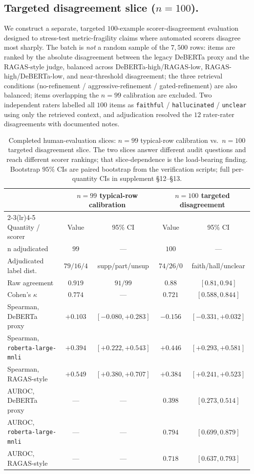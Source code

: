 \subsection{Targeted disagreement slice ($n=100$).}
\label{sec:human_cal_disagreement}

We construct a separate, targeted $100$-example scorer-disagreement
evaluation designed to stress-test metric-fragility claims where
automated scorers disagree most sharply. The batch is \emph{not} a
random sample of the $7{,}500$ rows: items are ranked by the absolute
disagreement between the legacy DeBERTa proxy and the RAGAS-style
judge, balanced across DeBERTa-high/RAGAS-low, RAGAS-high/DeBERTa-low,
and near-threshold disagreement; the three retrieval conditions
(no-refinement / aggressive-refinement / gated-refinement) are also
balanced; items overlapping the $n=99$ calibration are excluded.
Two independent raters labelled all $100$ items as
\texttt{faithful} / \texttt{hallucinated} / \texttt{unclear} using
only the retrieved context, and adjudication resolved the $12$
rater-rater disagreements with documented notes.

\begin{table}[!htb]
\centering
\caption{Completed human-evaluation slices: $n=99$ typical-row
calibration vs.\ $n=100$ targeted disagreement slice. The
two slices answer different audit questions and reach different
scorer rankings; that slice-dependence is the load-bearing finding.
Bootstrap $95\%$ CIs are paired bootstrap from the verification
scripts; full per-quantity CIs in supplement \S 12--\S 13.}
\label{tab:human_combined_main}
\footnotesize
\begin{tabular}{lcccc}
\toprule
& \multicolumn{2}{c}{$n=99$ typical-row calibration} & \multicolumn{2}{c}{$n=100$ targeted disagreement} \\
\cmidrule(lr){2-3}\cmidrule(lr){4-5}
Quantity / scorer & Value & 95\% CI & Value & 95\% CI \\
\midrule
n adjudicated & $99$ & --- & $100$ & --- \\
Adjudicated label dist.\ & $79/16/4$ & supp/part/unsup & $74/26/0$ & faith/hall/unclear \\
Raw agreement & $0.919$ & $91/99$ & $0.88$ & $[0.81, 0.94]$ \\
Cohen's $\kappa$ & $0.774$ & --- & $0.721$ & $[0.588, 0.844]$ \\
\addlinespace
Spearman, DeBERTa proxy & $+0.103$ & $[-0.080, +0.283]$ & $-0.156$ & $[-0.331, +0.032]$ \\
Spearman, \texttt{roberta-large-mnli} & $+0.394$ & $[+0.222, +0.543]$ & $+0.446$ & $[+0.293, +0.581]$ \\
Spearman, RAGAS-style & $+0.549$ & $[+0.380, +0.707]$ & $+0.384$ & $[+0.241, +0.523]$ \\
\addlinespace
AUROC, DeBERTa proxy & --- & --- & $0.398$ & $[0.273, 0.514]$ \\
AUROC, \texttt{roberta-large-mnli} & --- & --- & $0.794$ & $[0.699, 0.879]$ \\
AUROC, RAGAS-style & --- & --- & $0.718$ & $[0.637, 0.793]$ \\
\bottomrule
\end{tabular}
\end{table}

